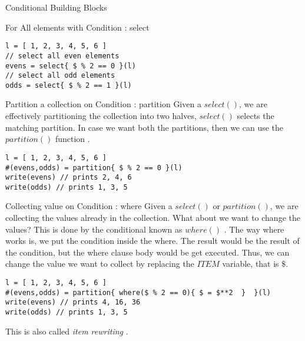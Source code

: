 \begin{section}{Conditional Building Blocks}
\begin{subsection}{For All elements with Condition : select }
\begin{lstlisting}[style=JexlStyle]
l = [ 1, 2, 3, 4, 5, 6 ]
// select all even elements 
evens = select{ $ % 2 == 0 }(l)
// select all odd elements 
odds = select{ $ % 2 == 1 }(l) 
\end{lstlisting}

\end{subsection}

\begin{subsection}{Partition a collection on Condition : partition }
Given a $select()$, we are effectively partitioning the collection into two halves,
$select()$ selects the matching partition. In case we want both the partitions, then 
we can use the $partition()$ function .

\begin{lstlisting}[style=JexlStyle]
l = [ 1, 2, 3, 4, 5, 6 ]
#(evens,odds) = partition{ $ % 2 == 0 }(l)
write(evens) // prints 2, 4, 6 
write(odds) // prints 1, 3, 5
\end{lstlisting}
\end{subsection}

\begin{subsection}{Collecting value on Condition : where }
Given a $select()$ or $partition()$, we are collecting the values already 
in the collection. What about we want to change the values? 
This is done by the conditional known as $where()$ .
The way where works is, we put the condition inside the where.
The result would be the result of the condition, but the where clause body 
would be get executed. Thus, we can change the value we want to collect
by replacing the $ITEM$ variable, that is $\$$.

\begin{center}\begin{minipage}{\linewidth}
\begin{lstlisting}[style=JexlStyle]
l = [ 1, 2, 3, 4, 5, 6 ]
#(evens,odds) = partition{ where($ % 2 == 0){ $ = $**2  }  }(l)
write(evens) // prints 4, 16, 36 
write(odds) // prints 1, 3, 5
\end{lstlisting}\end{minipage}
\end{center}

This is also called \emph{item rewriting} .
\end{subsection}

\end{section}


